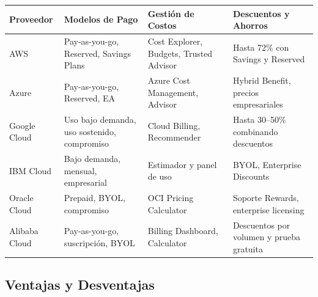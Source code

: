 {\begin{landscape}
                \begin{tabularx}{\linewidth}{|X|X|X|X|}
                    \hline
                    \textbf{Proveedor} & \textbf{Modelos de Pago} & \textbf{Gestión de Costos} & \textbf{Descuentos y Ahorros} \\
                    \hline
                    AWS & Pay-as-you-go, Reserved, Savings Plans & Cost Explorer, Budgets, Trusted Advisor & Hasta 72\% con Savings y Reserved \\
                    \hline
                    Azure & Pay-as-you-go, Reserved, EA & Azure Cost Management, Advisor & Hybrid Benefit, precios empresariales \\
                    \hline
                    Google Cloud & Uso bajo demanda, uso sostenido, compromiso & Cloud Billing, Recommender & Hasta 30–50\% combinando descuentos \\
                    \hline
                    IBM Cloud & Bajo demanda, mensual, empresarial & Estimador y panel de uso & BYOL, Enterprise Discounts \\
                    \hline
                    Oracle Cloud & Prepaid, BYOL, compromiso & OCI Pricing Calculator & Soporte Rewards, enterprise licensing \\
                    \hline
                    Alibaba Cloud & Pay-as-you-go, suscripción, BYOL & Billing Dashboard, Calculator & Descuentos por volumen y prueba gratuita \\
                    \hline
                \end{tabularx}
        \end{landscape}

        \begin{landscape}
            \subsection{Ventajas y Desventajas}
                    

\end{landscape}}
